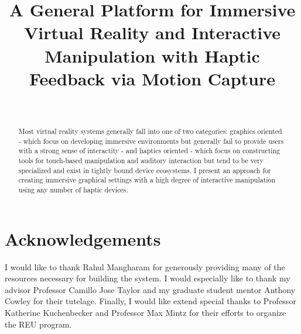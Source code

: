 \documentclass{IEEEtran}
\title{A General Platform for Immersive Virtual Reality and Interactive Manipulation with Haptic Feedback via Motion Capture}
\author{
    \IEEEauthorblockN{Armon Shariati} \\
\IEEEauthorblockA{Lehigh University \\ University of Pennsylvania}
}
\begin{document}
\setlength{\pdfpagewidth}{8.5in}
\setlength{\pdfpageheight}{11 in}
\maketitle

\begin{abstract}
    Most virtual reality systems generally fall into one of two categories:
    graphics oriented - which focus on developing immersive environments but
    generally fail to provide users with a strong sense of interactity - and
    haptics oriented - which focus on constructing tools for touch-based
    manipulation and auditory interaction but tend to be very specialized and
    exist in tightly bound device ecosystems. I present an approach for
    creating immersive graphical settings with a high degree of interactive
    manipulation using any number of haptic devices.
\end{abstract}







\section{Acknowledgements}
I would like to thank Rahul Mangharam for generously providing many of the
resources necessary for building the system. I would especially like to thank
my advisor Professor Camillo Jose Taylor and my graduate student mentor
Anthony Cowley for their tutelage. Finally, I would like extend special thanks
to Professor Katherine Kuchenbecker and Professor Max Mintz for their efforts
to organize the REU program.



\end{document}
